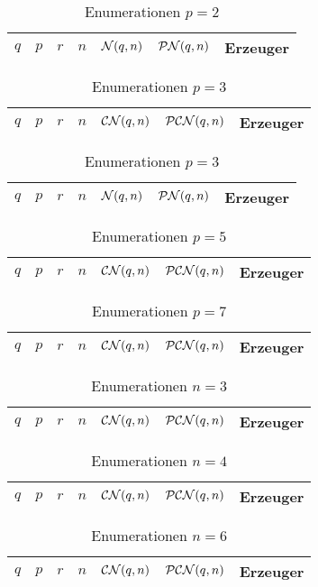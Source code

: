 \begin{longtable}{llllllp{7cm}}
  \caption{Enumerationen $p=2$}\\
  $q$ & $p$ & $r$ & $n$ & $\cal N(q,n)$ & $\PN(q,n)$ & Erzeuger \\\hline
  \endhead
  
\end{longtable}

\begin{longtable}{llllllp{7cm}}
  \caption{Enumerationen $p=3$}\\
  $q$ & $p$ & $r$ & $n$ & $\CN(q,n)$ & $\PCN(q,n)$ & Erzeuger \\\hline
  
\end{longtable}

\begin{longtable}{llllllp{7cm}}
  \caption{Enumerationen $p=3$}\\
  $q$ & $p$ & $r$ & $n$ & $\cal N(q,n)$ & $\PN(q,n)$ & Erzeuger \\\hline
  \endhead
  
\end{longtable}

\begin{longtable}{llllllp{7cm}}
  \caption{Enumerationen $p=5$}\\
  $q$ & $p$ & $r$ & $n$ & $\CN(q,n)$ & $\PCN(q,n)$ & Erzeuger \\\hline
  \endhead
  
\end{longtable}

\begin{longtable}{llllllp{7cm}}
  \caption{Enumerationen $p=7$}\\
  $q$ & $p$ & $r$ & $n$ & $\CN(q,n)$ & $\PCN(q,n)$ & Erzeuger \\\hline
  \endhead
  
\end{longtable}

\begin{longtable}{llllllp{7cm}}
  \caption{Enumerationen $n=3$}\\
  $q$ & $p$ & $r$ & $n$ & $\CN(q,n)$ & $\PCN(q,n)$ & Erzeuger \\\hline
  \endhead
  
\end{longtable}

\begin{longtable}{llllllp{7cm}}
  \caption{Enumerationen $n=4$}\\
  $q$ & $p$ & $r$ & $n$ & $\CN(q,n)$ & $\PCN(q,n)$ & Erzeuger \\\hline
  \endhead
  
\end{longtable}

\begin{longtable}{llllllp{7cm}}
  \caption{Enumerationen $n=6$}\\
  $q$ & $p$ & $r$ & $n$ & $\CN(q,n)$ & $\PCN(q,n)$ & Erzeuger \\\hline
  \endhead
  
\end{longtable}


